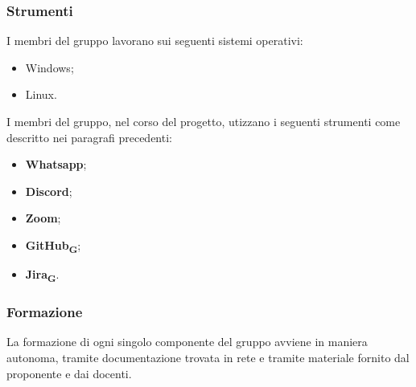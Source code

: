 	\subsubsection{Strumenti}
	I membri del gruppo lavorano sui seguenti sistemi operativi:
	\begin{itemize}
	\item Windows;
	\item Linux.
	\end{itemize}
	I membri del gruppo, nel corso del progetto, utizzano i seguenti strumenti come descritto nei paragrafi precedenti:
	\begin{itemize}
	\item \textbf{Whatsapp};
	\item \textbf{Discord};
	\item \textbf{Zoom};
	\item \textbf{GitHub\textsubscript{G}};
	\item \textbf{Jira\textsubscript{G}}.
	\end{itemize}

	\subsubsection{Formazione}
	La formazione di ogni singolo componente del gruppo avviene in maniera autonoma, tramite documentazione trovata in rete e tramite materiale fornito dal proponente e dai docenti.
